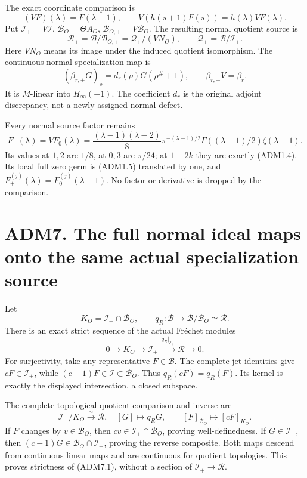 The exact coordinate comparison is \[
(VF)(\lambda)=F(\lambda-1),\qquad
V(h(s+1)F(s))=h(\lambda)VF(\lambda).
\tag{ADM6.8}
\] Put \(\mathcal I_+=V\mathcal I\), \(\mathcal B_O=\Theta A_O\),
\(\mathcal B_{O,+}=V\mathcal B_O\). The resulting normal quotient source
is \[
\mathcal R_+=\mathcal B/\mathcal B_{O,+}
=\mathcal Q_+/(V N_O),\qquad \mathcal Q_+=\mathcal B/\mathcal I_+.
\tag{ADM6.9}
\] Here \(V N_O\) means its image under the induced quotient
isomorphism. The continuous normal specialization map is \[
(\beta_{r,+}G)_\rho
=\overline{d_r(\rho)}G(\rho^\#+1),\qquad
\beta_{r,+}V=\beta_r .
\tag{ADM6.10}
\] It is \(M\)-linear into \(H_\infty(-1)\). The coefficient \(d_r\) is
the original adjoint discrepancy, not a newly assigned normal defect.

Every normal source factor remains \[
F_+(\lambda)=VF_0(\lambda)
=\frac{(\lambda-1)(\lambda-2)}8\pi^{-(\lambda-1)/2}
\Gamma((\lambda-1)/2)\zeta(\lambda-1).
\tag{ADM6.11}
\] Its values at \(1,2\) are \(1/8\), at \(0,3\) are \(\pi/24\); at
\(1-2k\) they are exactly (ADM1.4). Its local full zero germ is (ADM1.5)
translated by one, and \(F_+^{(j)}(\lambda)=F_0^{(j)}(\lambda-1)\). No
factor or derivative is dropped by the comparison.

\section{ADM7. The full normal ideal maps onto the same actual
specialization
source}\label{adm7.-the-full-normal-ideal-maps-onto-the-same-actual-specialization-source}

Let \[
K_O=\mathcal I_+\cap\mathcal B_O,\qquad
q_R:\mathcal B\to\mathcal B/\mathcal B_O\simeq\mathcal R.
\] There is an exact strict sequence of the actual Fréchet modules \[
\boxed{\quad
0\to K_O\to\mathcal I_+\xrightarrow{\,q_R|_{\mathcal I_+}\,}
\mathcal R\to0.
\quad}
\tag{ADM7.1}
\] For surjectivity, take any representative \(F\in\mathcal B\). The
complete jet identities give \(cF\in\mathcal I_+\), while
\((c-1)F\in\mathcal I\subset\mathcal B_O\). Thus \(q_R(cF)=q_R(F)\). Its
kernel is exactly the displayed intersection, a closed subspace.

The complete topological quotient comparison and inverse are \[
\mathcal I_+/K_O\xrightarrow{\sim}\mathcal R,\quad
[G]\mapsto q_R G,\qquad
[F]_{\mathcal B_O}\mapsto[cF]_{K_O}.
\tag{ADM7.2}
\] If \(F\) changes by \(v\in\mathcal B_O\), then
\(cv\in\mathcal I_+\cap\mathcal B_O\), proving well-definedness. If
\(G\in\mathcal I_+\), then \((c-1)G\in\mathcal B_O\cap\mathcal I_+\),
proving the reverse composite. Both maps descend from continuous linear
maps and are continuous for quotient topologies. This proves strictness
of (ADM7.1), without a section of \(\mathcal I_+\to\mathcal R\).

